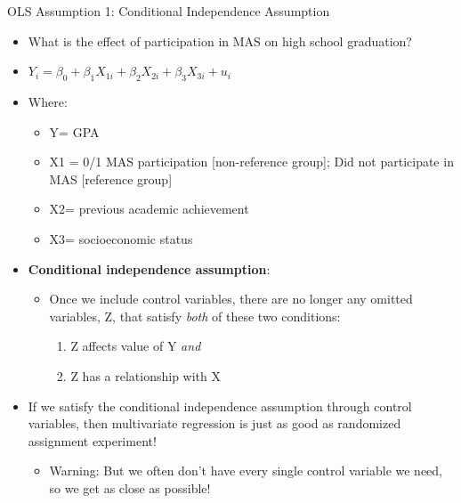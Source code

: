 \documentclass[
  8pt,
  ignorenonframetext,
  dvipsnames]{beamer}
\providecommand{\tightlist}{%
  \setlength{\itemsep}{0pt}\setlength{\parskip}{0pt}}
\renewcommand{\textbf}[1]{{\color{darkgray}\bfseries\fontfamily{Montserrat-TOsF}#1}}
\let\olditem\item
\renewcommand{\item}{%
  \olditem\vspace{4pt}
}
\begin{document}
\begin{frame}{OLS Assumption 1: Conditional Independence Assumption}
\protect\hypertarget{ols-assumption-1-conditional-independence-assumption-1}{}

\begin{itemize}
\tightlist
\item
  What is the effect of participation in MAS on high school graduation?
\item
  \(Y_i = \beta_0 + \beta_1X_{1i} + \beta_2X_{2i} + \beta_3X_{3i} + u_i\)
\item
  Where:

  \begin{itemize}
  \tightlist
  \item
    Y= GPA
  \item
    X1 = 0/1 MAS participation {[}non-reference group{]}; Did not
    participate in MAS {[}reference group{]}
  \item
    X2= previous academic achievement
  \item
    X3= socioeconomic status
  \end{itemize}
\item
  \textbf{Conditional independence assumption}:

  \begin{itemize}
  \tightlist
  \item
    Once we include control variables, there are no longer any omitted
    variables, Z, that satisfy \emph{both} of these two conditions:

    \begin{enumerate}
    [(1)]
    \tightlist
    \item
      Z affects value of Y \emph{and}
    \item
      Z has a relationship with X
    \end{enumerate}
  \end{itemize}
\item
  If we satisfy the conditional independence assumption through control
  variables, then multivariate regression is just as good as randomized
  assignment experiment!

  \begin{itemize}
  \tightlist
  \item
    Warning: But we often don't have every single control variable we
    need, so we get as close as possible!
  \end{itemize}
\end{itemize}

\end{frame}
\end{document}
